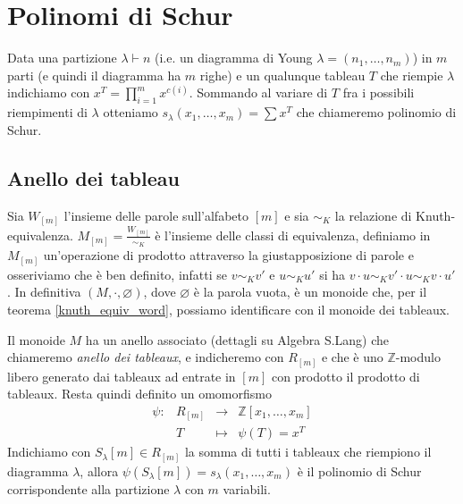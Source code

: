 \chapter{Polinomi di Schur}

\begin{defn}
Data una partizione $\lambda \vdash n$ (i.e. un diagramma di Young
$\lambda = (n_1, \ldots, n_m)$) in $m$ parti (e quindi il diagramma ha
$m$ righe) e un qualunque tableau $T$ che riempie $\lambda$ indichiamo
con $x^T = \prod\limits_{i = 1}^m x^{c(i)}$. Sommando al variare di
$T$ fra i possibili riempimenti di $\lambda$ otteniamo
\begin{math}
s_\lambda(x_1,\ldots,x_m) = \sum x^T
\end{math}
che chiameremo polinomio di Schur.
\end{defn}

\section{Anello dei tableau}

Sia $W_{[m]}$ l'insieme delle parole sull'alfabeto $[m]$ e sia
$\sim_K$ la relazione di Knuth-equivalenza. $M_{[m]} =
\frac{W_{[m]}}{\sim_K}$ \`e l'insieme delle classi di equivalenza,
definiamo in $M_{[m]}$ un'operazione di prodotto attraverso la giustapposizione di parole e
osseriviamo che \`e ben definito, infatti se $v \sim_K v'$ e $u \sim_K
u'$ si ha $v \cdot u \sim_K v' \cdot u \sim_K v \cdot u'$. In
definitiva $(M, \cdot, \varnothing)$, dove $\varnothing$ \`e la
parola vuota, \`e un monoide che, per il
teorema \ref{knuth_equiv_word}, possiamo identificare con il monoide
dei tableaux.

Il monoide $M$ ha un anello associato (dettagli su Algebra
S.Lang) che chiameremo \emph{anello dei tableaux}, e indicheremo con
$R_{[m]}$ e che \`e uno $\mathbb{Z}$-modulo libero generato dai
tableaux ad entrate in $[m]$ con prodotto il prodotto di tableaux.
Resta quindi definito un omomorfismo
\begin{equation}
\begin{matrix}\label{ring_tab}
\psi: & R_{[m]} & \rightarrow  & \mathbb{Z}[x_1,\ldots,x_m]\\
& T      & \mapsto & \psi(T)=x^T
\end{matrix}
\end{equation}
Indichiamo con $S_\lambda[m] \in R_{[m]}$ la somma di tutti i tableaux
che riempiono il diagramma $\lambda$, allora
$\psi(S_\lambda[m])=s_\lambda(x_1,\ldots,x_m)$ \`e il polinomio di
Schur corrispondente alla partizione $\lambda$ con $m$ variabili.


